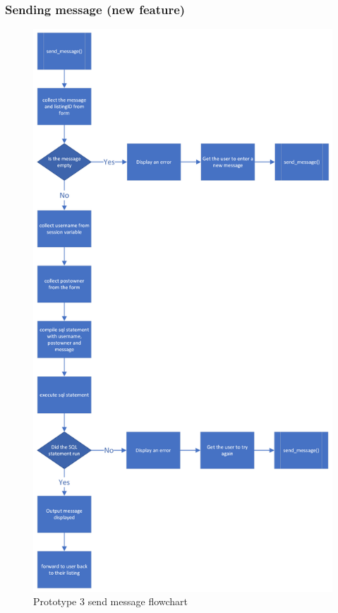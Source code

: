 \subsubsection{Sending message (new feature)}
  \begin{figure}[H]
    \centering
    \includegraphics[scale=0.4]{ch3_developing/proto3/flow_sendmessage.png}
    \caption{Prototype 3 send message flowchart}
    \label{fig:proto3_sendflow}
\end{figure}
